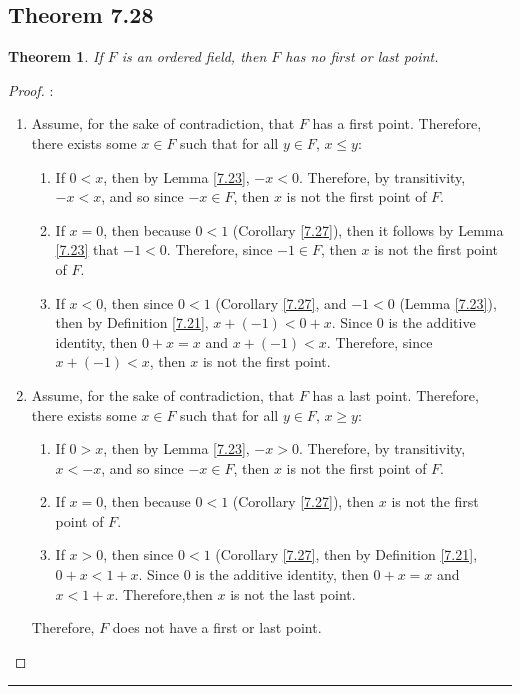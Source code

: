 \documentclass[openany, amssymb, psamsfonts]{amsart}
\newtheorem{thm}{Theorem}[section]
\theoremstyle{definition}
\numberwithin{equation}{section}
\begin{document}
\subsection*{Theorem 7.28}
\begin{thm}
\label{7.28}
    If $F$ is an ordered field, then $F$ has no first or last point.
\end{thm}  
\begin{proof}:
\begin{enumerate}
    \item Assume, for the sake of contradiction, that $F$ has a first point. Therefore, there exists some $x\in F$ such that for all $y\in F$, $x\leq y$:
    \begin{enumerate}
        \item If $0<x$, then by Lemma \ref{7.23}, $-x<0$. Therefore, by transitivity, $-x<x$, and so since $-x\in F$, then $x$ is not the first point of $F$.
        \item If $x= 0$, then because $0<1$ (Corollary \ref{7.27}), then it follows by Lemma \ref{7.23} that $-1<0$. Therefore, since $-1 \in F$, then $x$ is not the first point of $F$.
        \item If $x<0$, then since $0<1$ (Corollary \ref{7.27}, and $-1<0$ (Lemma \ref{7.23}), then by Definition \ref{7.21}, $x+(-1)<0+x$. Since $0$ is the additive identity, then $0+x = x$ and $x+(-1)<x$. Therefore, since $x+(-1)<x$, then $x$ is not the first point. 
    \end{enumerate}
    \item Assume, for the sake of contradiction, that $F$ has a last point. Therefore, there exists some $x\in F$ such that for all $y\in F$, $x\geq y$:
    \begin{enumerate}
        \item If $0>x$, then by Lemma \ref{7.23}, $-x>0$. Therefore, by transitivity, $x<-x$, and so since $-x\in F$, then $x$ is not the first point of $F$.
        \item If $x= 0$, then because $0<1$ (Corollary \ref{7.27}), then $x$ is not the first point of $F$.
        \item If $x>0$, then since $0<1$ (Corollary \ref{7.27}, then by Definition \ref{7.21}, $0+x<1+x$. Since $0$ is the additive identity, then $0+x = x$ and $x<1+x$. Therefore,then $x$ is not the last point. 
    \end{enumerate}
    Therefore, $F$ does not have a first or last point.
\end{enumerate}
 \end{proof}
\vspace{4pt}     \hrule   \vspace{4pt}
\end{document}
